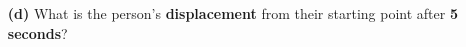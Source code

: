 \documentclass[A4,12pt]{article}
\begin{document}
\begin{enumerate}[label=\bfseries (\arabic*)]
\begin{itemize}
    \item[\bf (d)] What is the person’s \textbf{displacement} from their starting point after \textbf{5 seconds}?

\end{itemize}
\end{enumerate}
\end{document}
